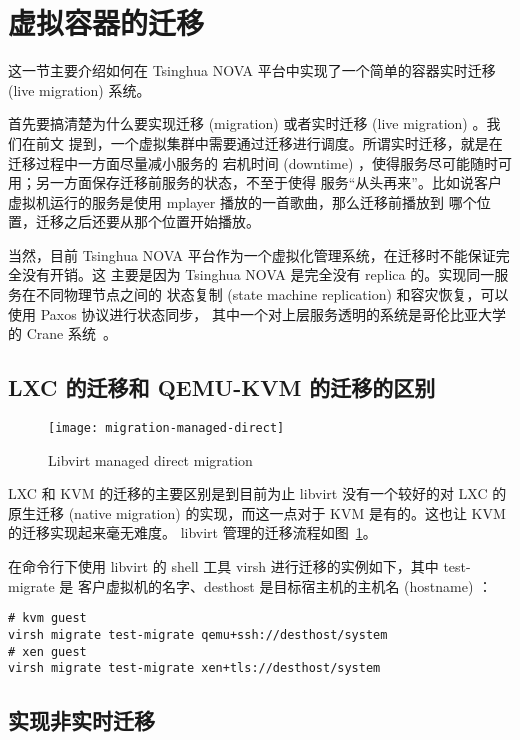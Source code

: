 \section{虚拟容器的迁移}

这一节主要介绍如何在 Tsinghua NOVA 平台中实现了一个简单的容器实时迁移 (live migration)
系统。

首先要搞清楚为什么要实现迁移 (migration) 或者实时迁移 (live migration) 。我们在前文
提到，一个虚拟集群中需要通过迁移进行调度。所谓实时迁移，就是在迁移过程中一方面尽量减小服务的
宕机时间 (downtime) ，使得服务尽可能随时可用；另一方面保存迁移前服务的状态，不至于使得
服务“从头再来”。比如说客户虚拟机运行的服务是使用 mplayer 播放的一首歌曲，那么迁移前播放到
哪个位置，迁移之后还要从那个位置开始播放。

当然，目前 Tsinghua NOVA 平台作为一个虚拟化管理系统，在迁移时不能保证完全没有开销。这
主要是因为 Tsinghua NOVA 是完全没有 replica 的。实现同一服务在不同物理节点之间的
状态复制 (state machine replication) 和容灾恢复，可以使用 Paxos 协议进行状态同步，
其中一个对上层服务透明的系统是哥伦比亚大学的 Crane 系统~\cite{cui2015p}。

\subsection{LXC 的迁移和 QEMU-KVM 的迁移的区别}

\begin{figure}[h]
    \centering
    \texttt{[image: migration-managed-direct]}
    \caption{Libvirt managed direct migration}
    \label{fig:migration-managed-direct}
\end{figure}

LXC 和 KVM 的迁移的主要区别是到目前为止 libvirt 没有一个较好的对 LXC 的原生迁移 (native
 migration) 的实现，而这一点对于 KVM 是有的。这也让 KVM 的迁移实现起来毫无难度。
libvirt 管理的迁移流程如图~\ref{fig:migration-managed-direct}。

在命令行下使用 libvirt 的 shell 工具 virsh 进行迁移的实例如下，其中 test-migrate 是
客户虚拟机的名字、desthost 是目标宿主机的主机名 (hostname) ：

\begin{lstlisting}
# kvm guest
virsh migrate test-migrate qemu+ssh://desthost/system
# xen guest
virsh migrate test-migrate xen+tls://desthost/system
\end{lstlisting}

\subsection{实现非实时迁移}

